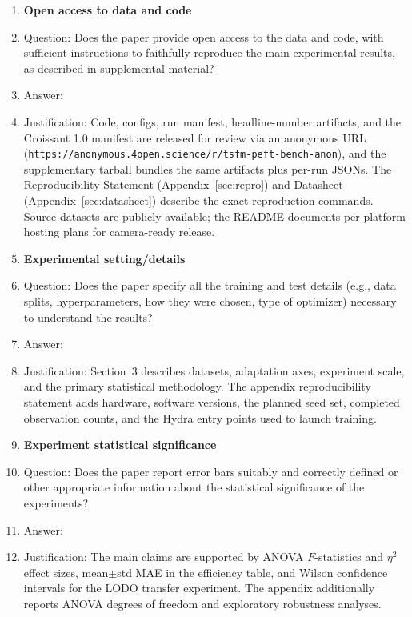 \begin{enumerate}
\item {\bf Open access to data and code}
    \item[] Question: Does the paper provide open access to the data and code, with sufficient instructions to faithfully reproduce the main experimental results, as described in supplemental material?
    \item[] Answer: \answerYes{}
    \item[] Justification: Code, configs, run manifest, headline-number artifacts, and the Croissant 1.0 manifest are released for review via an anonymous URL (\texttt{https://anonymous.4open.science/r/tsfm-peft-bench-anon}), and the supplementary tarball bundles the same artifacts plus per-run JSONs. The Reproducibility Statement (Appendix~\ref{sec:repro}) and Datasheet (Appendix~\ref{sec:datasheet}) describe the exact reproduction commands. Source datasets are publicly available; the README documents per-platform hosting plans for camera-ready release.

\item {\bf Experimental setting/details}
    \item[] Question: Does the paper specify all the training and test details (e.g., data splits, hyperparameters, how they were chosen, type of optimizer) necessary to understand the results?
    \item[] Answer: \answerYes{}
    \item[] Justification: Section~3 describes datasets, adaptation axes, experiment scale, and the primary statistical methodology. The appendix reproducibility statement adds hardware, software versions, the planned seed set, completed observation counts, and the Hydra entry points used to launch training.

\item {\bf Experiment statistical significance}
    \item[] Question: Does the paper report error bars suitably and correctly defined or other appropriate information about the statistical significance of the experiments?
    \item[] Answer: \answerYes{}
    \item[] Justification: The main claims are supported by ANOVA $F$-statistics and $\eta^2$ effect sizes, mean$\pm$std MAE in the efficiency table, and Wilson confidence intervals for the LODO transfer experiment. The appendix additionally reports ANOVA degrees of freedom and exploratory robustness analyses.


\end{enumerate}
